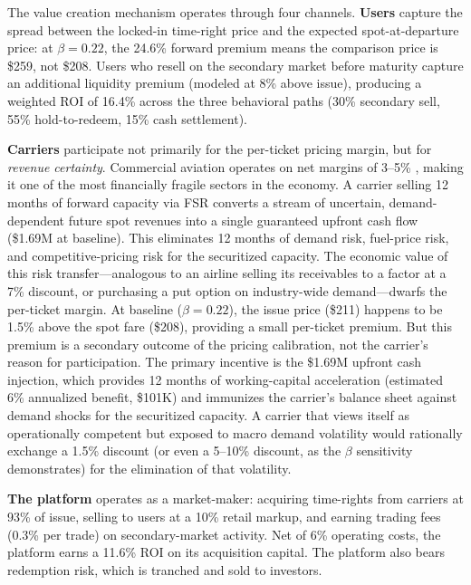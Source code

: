 \documentclass[12pt,a4paper]{article}
\begin{document}
The value creation mechanism operates through four channels. \textbf{Users} capture the spread between the locked-in time-right price and the expected spot-at-departure price: at $\beta = 0.22$, the 24.6\% forward premium means the comparison price is \$259, not \$208. Users who resell on the secondary market before maturity capture an additional liquidity premium (modeled at 8\% above issue), producing a weighted ROI of 16.4\% across the three behavioral paths (30\% secondary sell, 55\% hold-to-redeem, 15\% cash settlement).

\textbf{Carriers} participate not primarily for the per-ticket pricing margin, but for \textit{revenue certainty}. Commercial aviation operates on net margins of 3--5\% \cite{borenstein2011}, making it one of the most financially fragile sectors in the economy. A carrier selling 12 months of forward capacity via FSR converts a stream of uncertain, demand-dependent future spot revenues into a single guaranteed upfront cash flow (\$1.69M at baseline). This eliminates 12 months of demand risk, fuel-price risk, and competitive-pricing risk for the securitized capacity. The economic value of this risk transfer---analogous to an airline selling its receivables to a factor at a 7\% discount, or purchasing a put option on industry-wide demand---dwarfs the per-ticket margin. At baseline ($\beta = 0.22$), the issue price (\$211) happens to be 1.5\% above the spot fare (\$208), providing a small per-ticket premium. But this premium is a secondary outcome of the pricing calibration, not the carrier's reason for participation. The primary incentive is the \$1.69M upfront cash injection, which provides 12 months of working-capital acceleration (estimated 6\% annualized benefit, \$101K) and immunizes the carrier's balance sheet against demand shocks for the securitized capacity. A carrier that views itself as operationally competent but exposed to macro demand volatility would rationally exchange a 1.5\% discount (or even a 5--10\% discount, as the $\beta$ sensitivity demonstrates) for the elimination of that volatility.

\textbf{The platform} operates as a market-maker: acquiring time-rights from carriers at 93\% of issue, selling to users at a 10\% retail markup, and earning trading fees (0.3\% per trade) on secondary-market activity. Net of 6\% operating costs, the platform earns a 11.6\% ROI on its acquisition capital. The platform also bears redemption risk, which is tranched and sold to investors.
\end{document}
